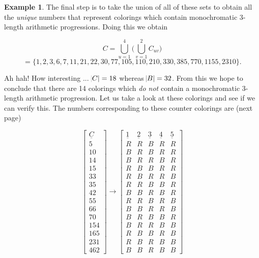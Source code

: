 \documentclass{article}
\theoremstyle{definition}
\theoremstyle{remark}
\theoremstyle{definition}
\newtheorem{example}{Example}[section]
\begin{document}
\begin{example}
    The final step is to take the union of all of these sets to obtain all the \textit{unique} numbers that represent colorings which contain monochromatic 3-length arithmetic progressions. Doing this we obtain 
    
    \begin{equation*}
        C = \bigcup\limits_{u=1}^4\bigg(\bigcup\limits_{v=1}^2 C_{uv}\bigg)
    \end{equation*}
    \begin{equation*}
        = \{1,2,3,6,7,11,21,22,30,77,105,110,210,330,385,770,1155,2310\}.
    \end{equation*}
    
    \noindent Ah hah! How interesting ... $\abs{C}=18$ whereas $\abs{B}=32$. From this we hope to conclude that there are 14 colorings which \textit{do not} contain a monochromatic 3-length arithmetic progression. Let us take a look at these colorings and see if we can verify this. The numbers corresponding to these counter colorings are (next page)
    
    \newpage
    
    \begin{equation*}
        \begin{bmatrix} \underline{C} \\ 5 \\ 10 \\ 14 \\ 15 \\ 33 \\ 35 \\ 42 \\ 55 \\ 66 \\ 70 \\ 154 \\ 165 \\ 231 \\ 462 \end{bmatrix}\rightarrow \begin{bmatrix} \underline{1} & \underline{2} & \underline{3} & \underline{4} & \underline{5} \\ R & R & B & R & R \\ B & R & B & R & R \\ B & R & R & B & R \\ R & B & B & R & R \\ R & B & R & R & B \\ R & R & B & B & R \\ B & B & R & B & R \\ R & R & B & R & B \\ B & B & R & R & B \\ B & R & B & B & R \\ B & R & R & B & B \\ R & B & B & R & B \\ R & B & R & B & B \\ B & B & R & B & B  \end{bmatrix}
    \end{equation*}
    
\end{example}
    
\end{document}
